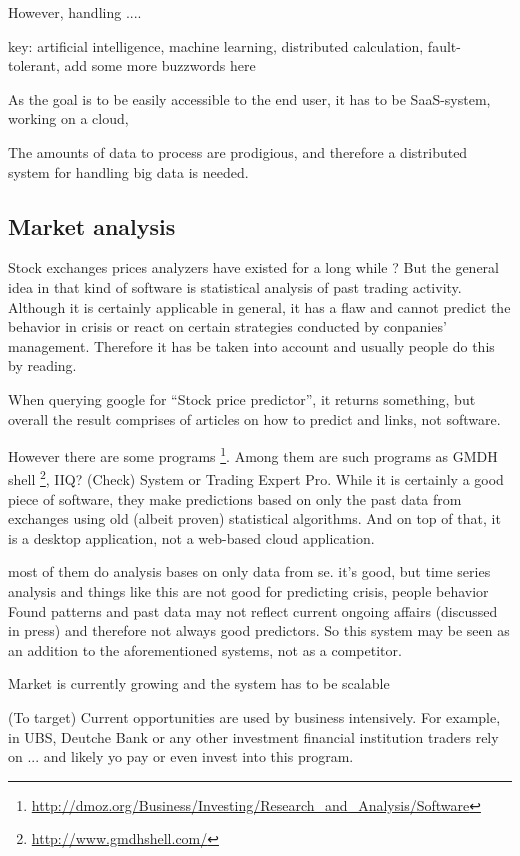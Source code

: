 \documentclass[a4paper,12pt]{article}
\begin{document}
However, handling .... 

key: artificial intelligence, machine learning, distributed calculation, fault-tolerant, add some more buzzwords here


As the goal is to be easily accessible to the end user, it has to be SaaS-system, working on a cloud, 

The amounts of data to process are prodigious, and therefore a distributed system for handling big data is needed. 

\subsection*{Market analysis}

Stock exchanges prices analyzers have existed for a long while ? But the general idea in that kind of software is statistical analysis of past trading activity. Although it is certainly applicable in general, it has a flaw and cannot predict the behavior in crisis or react on certain strategies conducted by conpanies' management. Therefore it has be taken into account and usually people do this by reading. 

When querying google for ``Stock price predictor'', it returns something, but overall the result comprises of articles on how to predict and links, not software.

However there are some programs \footnote{\url{http://dmoz.org/Business/Investing/Research\_and\_Analysis/Software}}. Among them are such programs as GMDH shell \footnote{\url{http://www.gmdhshell.com/}}, IIQ? (Check) System or Trading Expert Pro. While it is certainly a good piece of software, they make predictions based on only the past data from exchanges using old (albeit proven) statistical algorithms. And on top of that, it is a desktop application, not a web-based cloud application.

most of them do analysis bases on only data from se. it's good, but time series analysis and things like this are not good for predicting crisis, people behavior
Found patterns and past data may not reflect current ongoing affairs (discussed in press) and therefore not always good predictors. So this system may be seen as an addition to the aforementioned systems, not as a competitor.

Market is currently growing and the system has to be scalable

(To target)
Current opportunities are used by business intensively. For example, in UBS, Deutche Bank or any other investment financial institution traders rely on ... and likely yo pay or even invest into this program.
\end{document}
